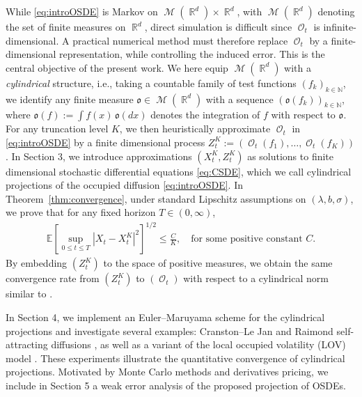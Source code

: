 \documentclass[11pt]{article}
\numberwithin{equation}{section}
\theoremstyle{plain}
\theoremstyle{definition}
\DeclareMathOperator{\R}{\mathbb{R}}
\DeclareMathOperator{\calM}{\mathcal{M}}
\DeclareMathOperator{\calO}{\mathcal{O}}
\def\mo{\mathfrak{o}}
\begin{document}
While \eqref{eq:introOSDE} is Markov on $\calM(\R^d)\times\R^d$, with $\calM(\R^d)$ denoting the set of finite measures on $\R^d$, direct simulation is difficult since 
$\calO_t$ is infinite-dimensional.
A practical numerical method must therefore  replace $\calO_t$ by a finite-dimensional representation, 
while controlling the induced error. This is the central objective of the present work. We here equip $\calM(\R^d)$ with a \emph{cylindrical} structure, i.e., taking a countable family of test functions $(f_k)_{k \in \mathbb N}$, we identify any finite measure $\mo \in \calM(\R^d)$ with a sequence $(\mo(f_k))_{k \in \mathbb N}$, where $\mo(f):=\int f(x) \, \mo(dx)$ denotes the integration of $f$ with respect to $\mo$. For any truncation level $K$, we then heuristically approximate $\calO_t$ in \eqref{eq:introOSDE} by a finite dimensional process $Z_t^K:=(\calO_t(f_1), \dotso, \calO_t(f_K))$. In Section 3, we introduce approximations $(X^K_t, Z_t^K)$ as solutions to finite dimensional stochastic differential equations \eqref{eq:CSDE}, which we call  cylindrical projections of the occupied diffusion \eqref{eq:introOSDE}. In Theorem~\ref{thm:convergence}, under standard Lipschitz assumptions on $(\lambda, b, \sigma)$, we prove that for any fixed horizon $T \in (0,\infty)$, 
\begin{align*}
    \mathbb E \left[ \sup_{0 \leq t\leq T} |X_t-X^K_t|^2 \right]^{1/2} \leq \frac{C}{K}, \quad \text{for some positive constant $C$.}
\end{align*}
By embedding $(Z_t^K)$ to the space of positive measures, we obtain the same convergence rate from $(Z_t^K)$ to $(\calO_t)$ with respect to a cylindrical norm similar to \cite{SonerTissotZhang}.


In Section 4, we implement an Euler--Maruyama scheme for the cylindrical projections and investigate several examples:
Cranston--Le Jan and Raimond self-attracting diffusions \cite{CranstonLeJan,Raimond}, as well as a variant of the 
local occupied volatility (LOV) model \cite{TissotLOV}.
These experiments illustrate the quantitative convergence of cylindrical projections. %
Motivated by Monte Carlo methods and derivatives pricing,  we include in Section 5 a weak error analysis of the proposed projection of OSDEs. %
\end{document}
